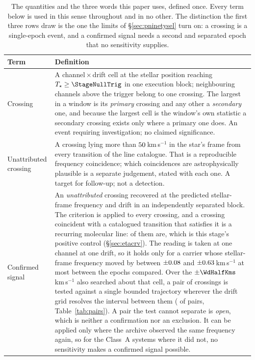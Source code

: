\begin{table}
\centering
\caption{The quantities and the three words this paper uses, defined once.
Every term below is used in this sense throughout and in no other. The
distinction the first three rows draw is the one the limits of
\S\ref{sec:pninetysel} turn on: a crossing is a single-epoch event, and a
confirmed signal needs a second and separated epoch that no sensitivity
supplies.}
\label{tab:quantities}
\small
\begin{tabular}{@{}p{}p{}@{}}
\hline
Term & Definition \\
\hline
Crossing &
A channel\,$\times$\,drift cell at the stellar position reaching
$T_\star\geq\StageNullTrig$ in one execution block; neighbouring channels
above the trigger belong to one crossing. The largest in a window is its
\emph{primary} crossing and any other a \emph{secondary} one, and because the
largest cell is the window's own statistic a secondary crossing exists only
where a primary one does. An event requiring investigation; no claimed
significance. \\
Unattributed crossing &
A crossing lying more than $50$\,km\,s$^{-1}$ in the star's frame
from every transition of the line catalogue. That is a reproducible frequency
coincidence; which coincidences are astrophysically plausible is a separate
judgement, stated with each one. A target for follow-up; not a detection. \\
Confirmed signal &
An \emph{unattributed} crossing recovered at the predicted stellar-frame
frequency and drift in an independently separated block. The criterion is
applied to every crossing, and a crossing coincident with a catalogued
transition that satisfies it is a recurring molecular line:
\MkAttrRecur{} of them are, which is this stage's positive control
(\S\ref{sec:etacrv}). The reading is taken at one channel at one drift, so it holds only for a
carrier whose stellar-frame frequency moved by between $\pm0.08$ and
$\pm0.63$\,km\,s$^{-1}$ at most between the epochs compared. Over the
$\pm\WdHalfKms$\,km\,s$^{-1}$ also searched about that cell, a pair of
crossings is tested against a single bounded trajectory wherever the drift
grid resolves the interval between them (\TjNPower{} of \TjNPair{} pairs,
Table~\ref{tab:pairs}). A pair the test cannot separate is \emph{open}, which
is neither a confirmation nor an exclusion. It can be applied only where the archive
observed the same frequency again, so for the \ZcNoRepSys{} Class~A systems
where it did not, no sensitivity makes a confirmed signal possible. \\

\end{tabular}
\end{table}
